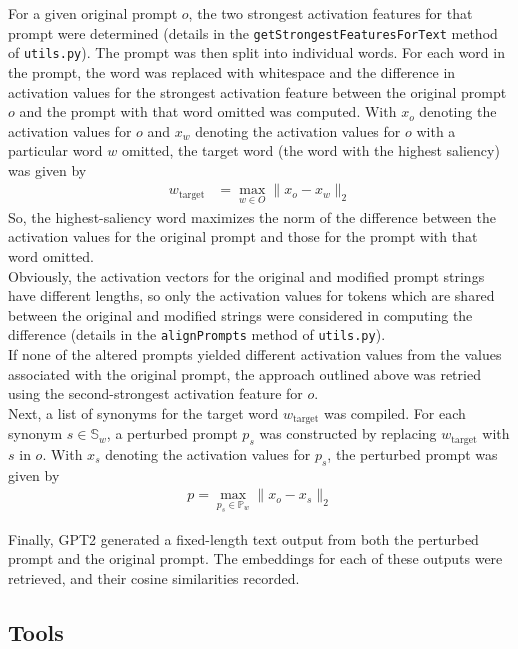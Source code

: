 \documentclass{article}
\begin{document}
For a given original prompt $o$, the two strongest activation features for that prompt were determined (details in the \texttt{getStrongestFeaturesForText} method of \texttt{utils.py}). The prompt was then split into individual words. For each word in the prompt, the word was replaced with whitespace and the difference in activation values for the strongest activation feature between the original prompt $o$ and the prompt with that word omitted was computed. With $x_{o}$ denoting the activation values for $o$ and $x_{w}$ denoting the activation values for $o$ with a particular word $w$ omitted, the target word (the word with the highest saliency) was given by
\begin{align*}
w_\text{target} &= \max_{w \in O} \lVert x_{o} - x_w \rVert_2 
\end{align*}
So, the highest-saliency word maximizes the norm of the difference between the activation values for the original prompt and those for the prompt with that word omitted. \\ 

Obviously, the activation vectors for the original and modified prompt strings have different lengths, so only the activation values for tokens which are shared between the original and modified strings were considered in computing the difference (details in the \texttt{alignPrompts} method of \texttt{utils.py}).\\ 

If none of the altered prompts yielded different activation values from the values associated with the original prompt, the approach outlined above was retried using the second-strongest activation feature for $o$. \\

Next, a list of synonyms for the target word $w_\text{target}$ was compiled. For each synonym $s \in \mathbb{S}_w$, a perturbed prompt $p_s$ was constructed by replacing $w_\text{target}$ with $s$ in $o$. With $x_s$ denoting the activation values for $p_s$, the perturbed prompt was given by 
\begin{align*}
p = \max_{p_s \in \mathbb{P}_w} \lVert x_o - x_s \rVert_2
\end{align*}

Finally, GPT2 generated a fixed-length text output from both the perturbed prompt and the original prompt. The embeddings for each of these outputs were retrieved, and their cosine similarities recorded.

\subsection*{Tools}
\end{document}
